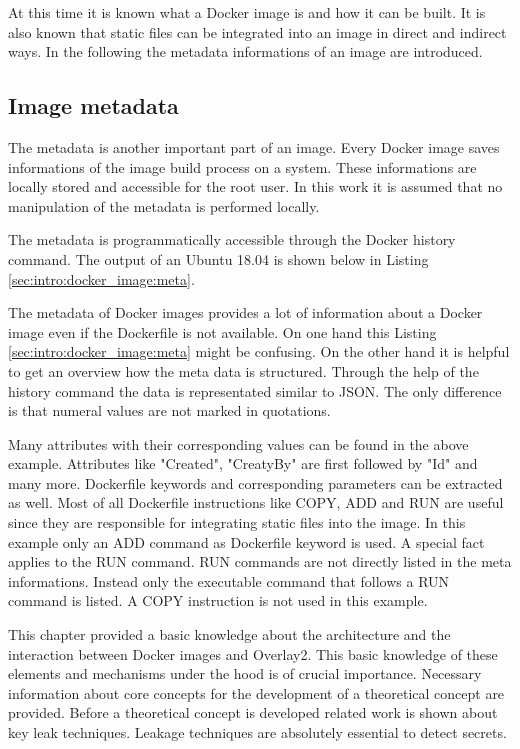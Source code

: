 At this time it is known what a Docker image is and how it can be built. 
It is also known that static files can be integrated into an image in direct and indirect ways. 
In the following the metadata informations of an image are introduced.

\subsection{Image metadata}
\label{sec:intro:docker_image:docker_img:meta}
The metadata is another important part of an image. 
Every Docker image saves informations of the image build process on a system.  
These informations are locally stored and accessible for the root user. 
In this work it is assumed that no manipulation of the metadata is performed locally. 

The metadata is programmatically accessible through the Docker history command. 
The output of an Ubuntu 18.04 is shown below in Listing \ref{sec:intro:docker_image:meta}.

The metadata of Docker images provides a lot of information about a Docker image even if the Dockerfile is not available. 
On one hand this Listing \ref{sec:intro:docker_image:meta} might be confusing. 
On the other hand it is helpful to get an overview how the meta data is structured. 
Through the help of the history command the data is representated similar to JSON. 
The only difference is that numeral values are not marked in quotations. 

Many attributes with their corresponding values can be found in the above example. 
Attributes like "Created", "CreatyBy" are first followed by "Id" and many more. 	
Dockerfile keywords and corresponding parameters can be extracted as well.
Most of all Dockerfile instructions like COPY, ADD and RUN are useful since they are responsible for integrating static files into the image.
In this example only an ADD command as Dockerfile keyword is used.
A special fact applies to the RUN command. 
RUN commands are not directly listed in the meta informations.
Instead only the executable command that follows a RUN command is listed.
A COPY instruction is not used in this example.

This chapter provided a basic knowledge about the architecture and the interaction between Docker images and Overlay2. 
This basic knowledge of these elements and mechanisms under the hood is of crucial importance. 
Necessary information about core concepts for the development of a theoretical concept are provided.
Before a theoretical concept is developed related work is shown about key leak techniques.
Leakage techniques are absolutely essential to detect secrets.